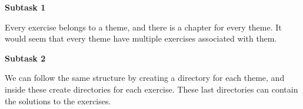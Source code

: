 \textbf{Subtask 1}

Every exercise belongs to a theme, and there is a chapter for every theme. It would seem that every theme have multiple exercises associated with them.

\textbf{Subtask 2}

We can follow the same structure by creating a directory for each theme, and inside these create directories for each exercise. These last directories can contain the solutions to the exercises.

